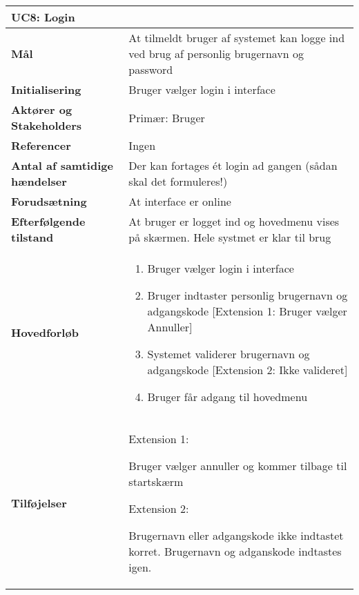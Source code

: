 \begin{table}[H] \centering
\begin{tabular}{|p{6cm}|p{8cm}|}
	\hline
\multicolumn{2}{|l|}{\textbf{UC8: Login}} \\\hline
\textbf{Mål}								
&At tilmeldt bruger af systemet kan logge ind ved brug af personlig brugernavn og password
 \\\hline
\textbf{Initialisering}					
&Bruger vælger login i interface
 \\\hline
\textbf{Aktører og Stakeholders}			
&Primær: Bruger
 \\\hline
\textbf{Referencer}						
&Ingen
 \\\hline
\textbf{Antal af samtidige hændelser}	
&Der kan fortages ét login ad gangen (sådan skal det formuleres!)
 \\\hline
\textbf{Forudsætning}					
&At interface er online
 \\\hline
\textbf{Efterfølgende tilstand}			
&At bruger er logget ind og hovedmenu vises på skærmen. Hele systmet er klar til brug
 \\\hline
\textbf{Hovedforløb}						
& 
\begin{enumerate}

\item Bruger vælger login i interface

\item Bruger indtaster personlig brugernavn og adgangskode [Extension 1: Bruger vælger Annuller]

\item Systemet validerer brugernavn og adgangskode [Extension 2: Ikke valideret]

\item Bruger får adgang til hovedmenu
 
\end{enumerate}
\\\hline

\textbf{Tilføjelser}						&

Extension 1:

Bruger vælger annuller og kommer tilbage til startskærm

Extension 2: 

Brugernavn eller adgangskode ikke indtastet korret. Brugernavn og adganskode indtastes igen. \\\hline
	\end{tabular}
	\label{UC9} 
\end{table}